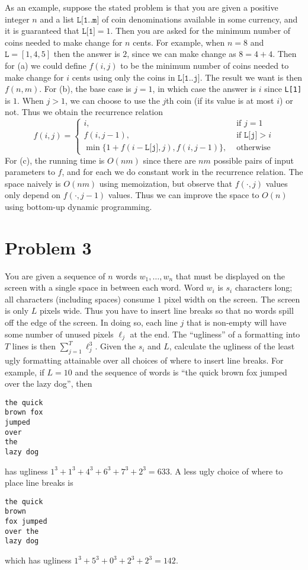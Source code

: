 \documentclass[12pt]{article}
\begin{document}
As an example, suppose the stated problem is that you are given a positive integer $n$ and a list $\texttt{L[1..m]}$ of coin denominations available in some currency, and it is guaranteed that $\texttt{L[1]} = 1$. Then you are asked for the minimum number of coins needed to make change for $n$ cents. For example, when $n = 8$ and $\texttt{L} = [1,4,5]$ then the answer is $2$, since we can make change as $8 = 4+4$. Then for (a) we could define $f(i, j)$ to be the minimum number of coins needed to make change for $i$ cents using only the coins in $\texttt{L[1..j]}$. The result we want is then $f(n, m)$. For (b), the base case is $j=1$, in which case the answer is $i$ since \texttt{L[1]} is $1$. When $j>1$, we can choose to use the $j$th coin (if its value is at most $i$) or not. Thus we obtain the recurrence relation
$$
f(i, j) = 
\begin{cases}
i, & \text{ if } j = 1\\
f(i,j-1), & \text{ if } \texttt{L[j]}>i\\
\min\{1 + f(i-\texttt{L[j]}, j), f(i,j-1)\}, & \text{ otherwise}
\end{cases}
$$
For (c), the running time is $O(nm)$ since there are $nm$ possible pairs of input parameters to $f$, and for each we do constant work in the recurrence relation. The space naively is $O(nm)$ using memoization, but observe that $f(\cdot, j)$ values only depend on $f(\cdot, j-1)$ values. Thus we can improve the space to $O(n)$ using bottom-up dynamic programming.



\section*{Problem 3}

You are given a sequence of $n$ words $w_1,\ldots,w_n$ that must be displayed on the screen with a single space in between each word. Word $w_i$ is $s_i$ characters long; all characters (including spaces) consume $1$ pixel width on the screen. The screen is only $L$ pixels wide. Thus you have to insert line breaks so that no words spill off the edge of the screen. In doing so, each line $j$ that is non-empty will have some number of unused pixels $\ell_j$ at the end. The ``ugliness'' of a formatting into $T$ lines is then $\sum_{j=1}^T \ell_j^3$. Given the $s_i$ and $L$, calculate the ugliness of the least ugly formatting attainable over all choices of where to insert line breaks. For example, if $L = 10$ and the sequence of words is ``the quick brown fox jumped over the lazy dog'', then
\begin{verbatim}
the quick
brown fox
jumped
over
the
lazy dog
\end{verbatim}
has ugliness $1^3 + 1^3 + 4^3 + 6^3 + 7^3 + 2^3 = 633$. A less ugly choice of where to place line breaks is
\begin{verbatim}
the quick
brown
fox jumped
over the
lazy dog
\end{verbatim}
which has ugliness $1^3 + 5^3 + 0^3 + 2^3 + 2^3 = 142$.
\end{document}
